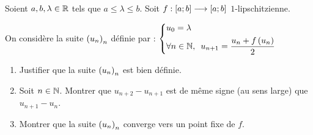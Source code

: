 \begin{corr}
\end{corr}

\begin{exo}
Soient \(a,b,\lambda\in\mathbb{R}\) tels que \(a\leq\lambda\leq b\). Soit \(f:\left[a;b\right]\longrightarrow\left[a;b\right]\) \(1\)-lipschitzienne.

On considère la suite \(\left(u_n\right)_n\) définie par : \(\begin{dcases}u_0=\lambda \\ \quantifs{\forall n\in\N}u_{n+1}=\dfrac{u_n+f\paren{u_n}}{2}\end{dcases}\)

\begin{enumerate}
\item Justifier que la suite \(\left(u_n\right)_n\) est bien définie. \\

\item Soit \(n\in\mathbb{N}\). Montrer que \(u_{n+2}-u_{n+1}\) est de même signe (au sens large) que \(u_{n+1}-u_n\). \\

\item Montrer que la suite \(\left(u_n\right)_n\) converge vers un point fixe de \(f\).
\end{enumerate}
\end{exo}

\begin{corr}
\end{corr}